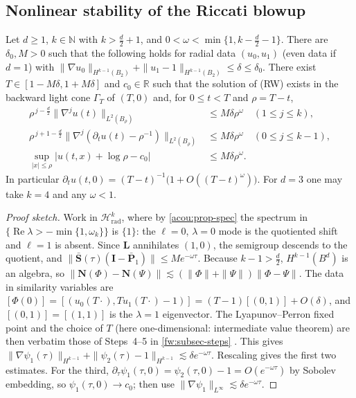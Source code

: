 \subsection{Nonlinear stability of the Riccati blowup}
\label{acou:sub-nonlin}
\begin{theorem}\label{acou:thm-rad}
Let $d\ge1$, $k\in\mathbb N$ with $k>\frac d2+1$, and $0<\omega<\min\{1,k-\frac d2-1\}$.
There are $\delta_0,M>0$ such that the following holds for radial data
$(u_0,u_1)$ (even data if $d=1$) with
$\|\nabla u_0\|_{H^{k-1}(B_{2})}+\|u_1-1\|_{H^{k-1}(B_{2})}\le\delta\le\delta_0$.
There exist $T\in[1-M\delta,1+M\delta]$ and $c_0\in\mathbb R$ such that the
solution of (RW) exists in the backward light cone $\Gamma_T$ of $(T,0)$ and,
for $0\le t<T$ and $\rho=T-t$,
\begin{align*}
  \rho^{\,j-\frac d2}\|\nabla^ju(t)\|_{L^2(B_\rho)}&\le M\delta\rho^{\omega}\quad(1\le j\le k),\\
  \rho^{\,j+1-\frac d2}\|\nabla^j(\partial_tu(t)-\rho^{-1})\|_{L^2(B_\rho)}&\le M\delta\rho^{\omega}\quad(0\le j\le k-1),\\
  \sup_{|x|\le\rho}|u(t,x)+\log\rho-c_0|&\le M\delta\rho^{\omega}.
\end{align*}
In particular $\partial_tu(t,0)=(T-t)^{-1}\big(1+O((T-t)^\omega)\big)$. For
$d=3$ one may take $k=4$ and any $\omega<1$.
\end{theorem}
\begin{proof}[Proof sketch]
Work in $\mathcal H^k_{\mathrm{rad}}$, where by \cref{acou:prop-spec} the
spectrum in $\{\operatorname{Re}\lambda>-\min\{1,\omega_k\}\}$ is $\{1\}$:
the $\ell=0$, $\lambda=0$ mode is the quotiented shift and $\ell=1$ is
absent. Since $\mathbf L$ annihilates $(1,0)$, the semigroup descends to
the quotient, and $\|\bar{\mathbf S}(\tau)(\mathbf I-\bar{\mathbf P}_1)\|\le Me^{-\omega\tau}$.
Because $k-1>\frac d2$, $H^{k-1}(B^d)$ is an algebra, so
$\|\mathbf N(\Phi)-\mathbf N(\Psi)\|\lesssim(\|\Phi\|+\|\Psi\|)\|\Phi-\Psi\|$.
The data in similarity variables are
$[\Phi(0)]=[(u_0(T\cdot),Tu_1(T\cdot)-1)]=(T-1)[(0,1)]+O(\delta)$, and
$[(0,1)]=[(1,1)]$ is the $\lambda=1$ eigenvector. The Lyapunov--Perron
fixed point and the choice of $T$ (here one-dimensional: intermediate value
theorem) are then verbatim those of Steps~4--5 in \cref{fw:subsec-steps}
\cite{DonningerSchoerkhuber2012,DonningerSchoerkhuber2017}. This gives
$\|\nabla\psi_1(\tau)\|_{H^{k-1}}+\|\psi_2(\tau)-1\|_{H^{k-1}}\lesssim\delta e^{-\omega\tau}$.
Rescaling gives the first two estimates. For the third, $\partial_\tau\psi_1(\tau,0)=\psi_2(\tau,0)-1=O(e^{-\omega\tau})$
by Sobolev embedding, so $\psi_1(\tau,0)\to c_0$; then use $\|\nabla\psi_1\|_{L^\infty}\lesssim\delta e^{-\omega\tau}$.
\end{proof}

